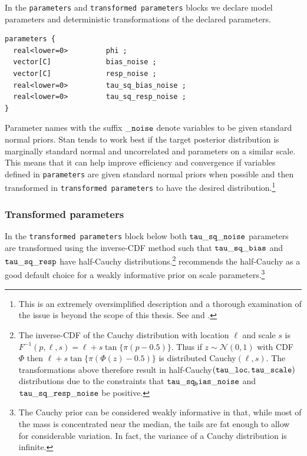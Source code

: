 In the {\tt parameters} and {\tt transformed parameters} blocks we declare model parameters and deterministic transformations of the declared parameters. 

\begin{singlespacing}
\small
\begin{verbatim}
parameters {
  real<lower=0>         phi ;
  vector[C]             bias_noise ;
  vector[C]             resp_noise ;
  real<lower=0>         tau_sq_bias_noise ;
  real<lower=0>         tau_sq_resp_noise ;
}
\end{verbatim}
\end{singlespacing}


\noindent Parameter names with the suffix ${\tt \_noise}$ denote variables to be given standard normal priors. Stan tends to work best if the target posterior distribution is marginally standard normal and uncorrelated and parameters on a  similar scale. This means that it can help improve efficiency and convergence if variables defined in {\tt parameters} are given standard normal priors when possible and then transformed in {\tt transformed parameters} to have the desired distribution.\footnote{This is an extremely oversimplified description and a thorough examination of the issue is beyond the scope of this thesis. See  and .} 


\subsubsection{Transformed parameters}

In the {\tt transformed parameters} block below both ${\tt tau\_sq\_noise}$ parameters are transformed using the inverse-CDF method such that ${\tt tau\_sq\_bias}$ and ${\tt tau\_sq\_resp}$ have half-Cauchy distributions.\footnote{The inverse-CDF of the Cauchy distribution with location $\ell$ and scale $s$ is $F^{-1}(p, \ell,s)  = \ell + s \tan{\{ \pi (p - 0.5)\}}$. Thus if $z \sim \mathcal{N}(0,1)$ with CDF $\Phi$ then $\ell + s \tan{\{ \pi (\Phi(z) - 0.5)\}}$ is distributed Cauchy$(\ell, s)$. The transformations above therefore result in half-Cauchy$({\tt tau\_loc}, {\tt tau\_scale})$ distributions due to the constraints that ${\tt tau\_sq_bias\_noise}$ and ${\tt tau\_sq\_resp\_noise}$ be positive.}  recommends the half-Cauchy as a good default choice for a weakly informative prior on scale parameters.\footnote{The Cauchy prior can be considered weakly informative in that, while most of the mass is concentrated near the median, the tails are fat enough to allow for considerable variation. In fact, the variance of a Cauchy distribution is infinite.}

